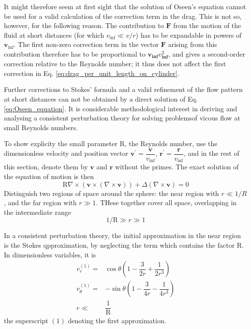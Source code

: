 \documentclass[conference]{IEEEtran}
\theoremstyle{definition}
\theoremstyle{remark}
\begin{document}
    It might therefore seem at first sight that the solution of Oseen's equation cannot be used for a valid calculation of the correction term in the drag. This is not so, however, for the following reason. The contribution to $\mathbf{F}$ from the motion of the fluid at short distances (for which $v_\mathrm{inf} \ll v / r$) has to be expandable in powers of $\mathbf{v}_\mathrm{inf}$. The first non-zero correction term in the vector $\mathbf{F}$ arising from this contribution therefore has to be proportional to $\mathbf{v}_\mathbf{inf} v_\mathbf{inf}^2$, and gives a second-order correction relative to the Reynolds number; it thus does not affect the first correction in Eq. \ref{eq:drag_per_unit_length_on_cylinder}.

    Further corrections to Stokes' formula and a valid refinement of the flow pattern at short distances can  not be obtained by a direct solution of Eq. \ref{eq:Oseen_equation}. It is considerable methodological interest in deriving and analysing a consistent perturbation theory for solving problemsof vicous flow at small Reynolds numbers.

    To show explicity the small parameter $\mathrm{R}$, the Reynolds number, use the dimensionless velocity and position vector $\mathbf{v}^\prime = \dfrac{\mathbf{v}}{v_\mathrm{inf}}$, $\mathbf{r}^\prime = \dfrac{\mathbf{r}}{v_\mathrm{inf}}$, and in the rest of this section, denote them by $\mathbf{v}$ and $\mathbf{r}$ without the primes. The exact solution of the equation of motion is then
    \begin{equation}
        \mathrm{R} \nabla \times (\mathbf{v} \times (\nabla \times \mathbf{v})) + \Delta (\nabla \times \mathbf{v}) = 0
    \end{equation}
    Distinguish two regions of space around the sphere: the near region with $r \ll 1/R$, and the far region with $r \gg 1$. THese together cover all space, overlapping in the intermediate range
    \begin{equation}
        1/\mathrm{R} \gg r \gg 1
    \end{equation}

    In a consistent perturbation theory, the initial approximation in the near region is the Stokes qpproximation, by neglecting the term which contains the factor $\mathrm{R}$. In dimensionless variables, it is
    \begin{align}
        v_r^{(1)} =& \cos \theta \left(1 - \dfrac3{2r} + \dfrac1{2r^3} \right) \nonumber \\
        v_\theta^{(1)} =& -\sin \theta \left( 1 - \dfrac3{4r} -\dfrac1{4r^3} \right) \nonumber \\
        r \ll& \dfrac{1}{\mathrm{R}}
        \label{eq:r_ll_1/R}
    \end{align}
    the superscript $(1)$ denoting the first approximation.
\end{document}

